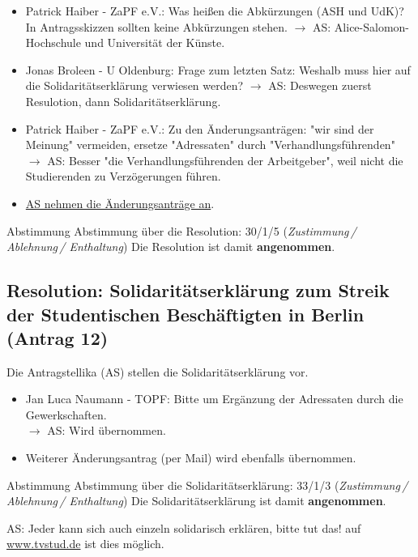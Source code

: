     \begin{itemize}
      \item Patrick Haiber - ZaPF e.V.:  Was heißen die Abkürzungen (ASH und UdK)? In Antragsskizzen sollten keine Abkürzungen stehen.
        $\rightarrow$ AS: Alice-Salomon-Hochschule und Universität der Künste.
      \item Jonas Broleen - U Oldenburg:  Frage zum letzten Satz: Weshalb muss hier auf die Solidaritätserklärung verwiesen werden?
        $\rightarrow$ AS: Deswegen zuerst Resulotion, dann Solidaritätserklärung.
      \item Patrick Haiber - ZaPF e.V.:  Zu den Änderungsanträgen: "wir sind der Meinung" vermeiden, ersetze "Adressaten" durch "Verhandlungsführen\-den"
        $\rightarrow$ AS: Besser "die Verhandlungsführenden der Arbeitgeber", weil nicht die Studierenden zu Verzögerungen führen.
      \item \uline{AS nehmen die Änderungsanträge an}.
    \end{itemize}

    \begin{success}{Abstimmung}
      Abstimmung über die Resolution: 30/1/5 (\textit{Zustimmung\,/ Ablehnung\,/ Enthaltung})
      Die Resolution ist damit \textbf{angenommen}.
    \end{success}

  \subsection*{Resolution: Solidaritätserklärung zum Streik der Studentischen Beschäftigten in Berlin (Antrag 12)}
    Die Antragstellika (AS) stellen die Solidaritätserklärung vor. \\

    \begin{itemize}
      \item Jan Luca Naumann - TOPF:  Bitte um Ergänzung der Adressaten durch die Gewerkschaften. \\
        $\rightarrow$ AS: Wird übernommen.
      \item Weiterer Änderungsantrag (per Mail) wird ebenfalls übernommen.
    \end{itemize}

    \begin{success}{Abstimmung}
      Abstimmung über die Solidaritätserklärung: 33/1/3 (\textit{Zustimmung\,/ Ablehnung\,/ Enthaltung})
      Die Solidaritätserklärung ist damit \textbf{angenommen}.
    \end{success}
    AS: Jeder kann sich auch einzeln solidarisch erklären, bitte tut das!
    auf \url{www.tvstud.de} ist dies möglich.

